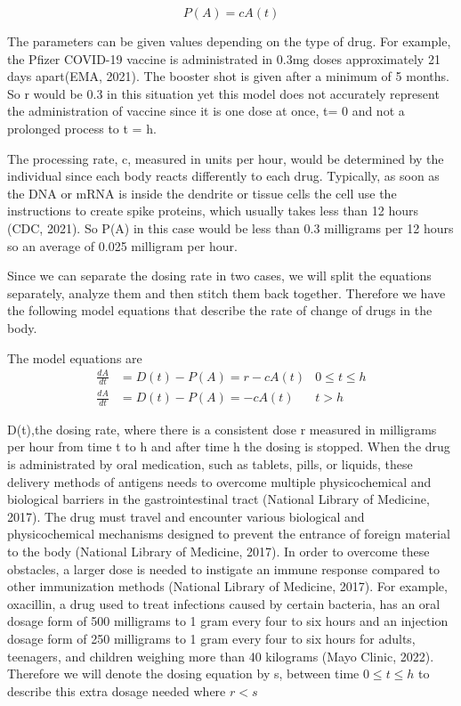 \documentclass{article}
\begin{document}
$$P(A) = cA(t)$$

The parameters can be given values depending on the type of drug. For example, the Pfizer COVID-19 vaccine is administrated in 0.3mg doses approximately 21 days apart(EMA, 2021). The booster shot is given after a minimum of 5 months. So r would be 0.3 in this situation yet this model does not accurately represent the administration of vaccine since it is one dose at once, t= 0 and not a prolonged process to t = h. 

The processing rate, c, measured in units per hour, would be determined by the individual since each body reacts differently to each drug. Typically, as soon as the DNA or mRNA is inside the dendrite or tissue cells the cell use the instructions to create spike proteins, which usually takes less than 12 hours (CDC, 2021). So P(A) in this case would be less than 0.3 milligrams per 12 hours so an average of 0.025 milligram per hour. 

Since we can separate the dosing rate in two cases, we will split the equations separately, analyze them and then stitch them back together. Therefore we have the following model equations that describe the rate of change of drugs in the body.

The model equations are
\begin{align}
\frac{dA}{dt} &= D(t) - P(A) = r - cA(t) & 0 \leq t \leq h \\
\frac{dA}{dt} &= D(t) - P(A) = - cA(t) & t > h 
\end{align}

D(t),the dosing rate, where there is a consistent dose r measured in milligrams per hour from time t to h and after time h the dosing is stopped. When the drug is administrated by oral medication, such as tablets, pills, or liquids, these delivery methods of antigens needs to overcome multiple physicochemical and biological barriers in the gastrointestinal tract (National Library of Medicine, 2017). The drug must travel and encounter various biological and physicochemical mechanisms designed to prevent the entrance of foreign material to the body (National Library of Medicine, 2017). In order to overcome these obstacles, a larger dose is needed to instigate an immune response compared to other immunization methods (National Library of Medicine, 2017). For example, oxacillin, a drug used to treat infections caused by certain bacteria, has an oral dosage form of 500 milligrams to 1 gram every four to six hours and an injection dosage form of 250 milligrams to 1 gram every four to six hours for adults, teenagers, and children weighing more than 40 kilograms (Mayo Clinic, 2022). Therefore we will denote the dosing equation by s, between time $0 \leq t \leq h$ to describe this extra dosage needed where $r<s$
\end{document}
